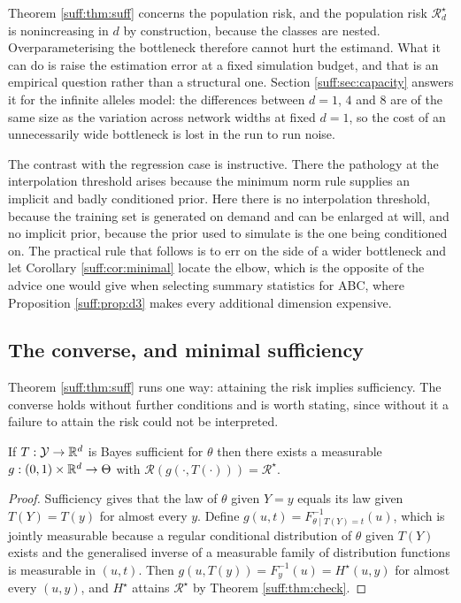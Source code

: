 Theorem \ref{suff:thm:suff} concerns the population risk, and the population risk
$\mathcal{R}^\star_d$ is nonincreasing in $d$ by construction, because the classes are nested.
Overparameterising the bottleneck therefore cannot hurt the estimand. What it can do is raise
the estimation error at a fixed simulation budget, and that is an empirical question rather
than a structural one. Section \ref{suff:sec:capacity} answers it for the infinite alleles
model: the differences between $d=1$, $4$ and $8$ are of the same size as the variation across
network widths at fixed $d=1$, so the cost of an unnecessarily wide bottleneck is lost in the
run to run noise.

The contrast with the regression case is instructive. There the pathology at the
interpolation threshold arises because the minimum norm rule supplies an implicit and badly
conditioned prior. Here there is no interpolation threshold, because the training set is
generated on demand and can be enlarged at will, and no implicit prior, because the prior
used to simulate is the one being conditioned on. The practical rule that follows is to err
on the side of a wider bottleneck and let Corollary \ref{suff:cor:minimal} locate the elbow,
which is the opposite of the advice one would give when selecting summary statistics for ABC,
where Proposition \ref{suff:prop:d3} makes every additional dimension expensive.

\subsection{The converse, and minimal sufficiency}

Theorem \ref{suff:thm:suff} runs one way: attaining the risk implies sufficiency. The converse
holds without further conditions and is worth stating, since without it a failure to attain
the risk could not be interpreted.

\begin{proposition}[Converse]
\label{suff:prop:converse}
If $T:\mathcal{Y}\to\mathbb{R}^d$ is Bayes sufficient for $\theta$ then there exists a measurable
$g:(0,1)\times\mathbb{R}^d\to\Theta$ with $\mathcal{R}(g(\cdot,T(\cdot)))=\mathcal{R}^\star$.
\end{proposition}

\begin{proof}
Sufficiency gives that the law of $\theta$ given $Y=y$ equals its law given $T(Y)=T(y)$ for
almost every $y$. Define $g(u,t)=F^{-1}_{\theta\mid T(Y)=t}(u)$, which is jointly measurable
because a regular conditional distribution of $\theta$ given $T(Y)$ exists and the
generalised inverse of a measurable family of distribution functions is measurable in
$(u,t)$. Then $g(u,T(y))=F^{-1}_{y}(u)=H^\star(u,y)$ for almost every $(u,y)$, and $H^\star$
attains $\mathcal{R}^\star$ by Theorem \ref{suff:thm:check}.
\end{proof}

